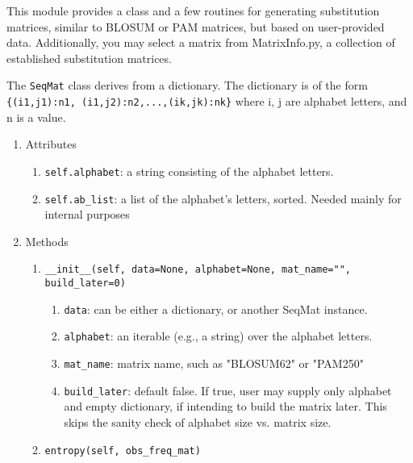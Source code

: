 This module provides a class and a few routines for generating substitution matrices, similar to BLOSUM or PAM matrices, but based on user-provided data. Additionally, you may select a matrix from MatrixInfo.py, a collection of established substitution matrices.

The \verb+SeqMat+ class derives from a dictionary.
The dictionary is of the form \verb|{(i1,j1):n1, (i1,j2):n2,...,(ik,jk):nk}| where i, j are alphabet letters, and n is a value.

\begin{enumerate}
  \item Attributes
  \begin{enumerate}
    \item \verb|self.alphabet|: a string consisting of the alphabet letters.

    \item \verb|self.ab_list|: a list of the alphabet's letters, sorted. Needed mainly for internal purposes
  \end{enumerate}

  \item Methods

  \begin{enumerate}

    \item
\begin{verbatim}
__init__(self, data=None, alphabet=None, mat_name="", build_later=0)
\end{verbatim}

    \begin{enumerate}

      \item \verb|data|: can be either a dictionary, or another SeqMat instance.
      \item \verb|alphabet|: an iterable (e.g., a string) over the alphabet letters.

      \item \verb|mat_name|: matrix name, such as "BLOSUM62" or "PAM250"

      \item \verb|build_later|: default false. If true, user may supply only alphabet and empty dictionary, if intending to build the matrix later. This skips the sanity check of alphabet size vs. matrix size.

    \end{enumerate}

    \item
\begin{verbatim}
entropy(self, obs_freq_mat)
\end{verbatim}


\end{enumerate}
\end{enumerate}
